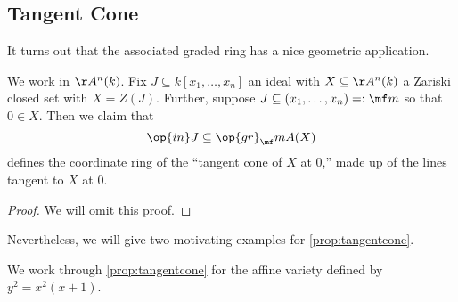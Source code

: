 \subsection{Tangent Cone}
It turns out that the associated graded ring has a nice geometric application.
\begin{prop} \label{prop:tangentcone}
	We work in $\AA^n(k)$. Fix $J\subseteq k[x_1,\ldots,x_n]$ an ideal with $X\subseteq\AA^n(k)$ a Zariski closed set with $X=Z(J)$. Further, suppose $J\subseteq(x_1,\ldots,x_n)=:\mf m$ so that $0\in X$. Then we claim that
	\[\op{in}J\subseteq\op{gr}_\mf mA(X)\]
	defines the coordinate ring of the ``tangent cone of $X$ at $0$,'' made up of the lines tangent to $X$ at $0$.
\end{prop}
\begin{proof}
	We will omit this proof.
\end{proof}
Nevertheless, we will give two motivating examples for \autoref{prop:tangentcone}.
\begin{exe}
	We work through \autoref{prop:tangentcone} for the affine variety defined by $y^2=x^2(x+1)$.
\end{exe}
